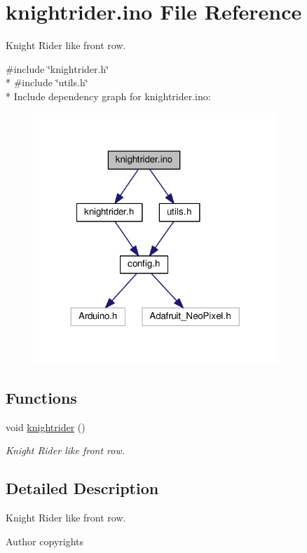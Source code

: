 \hypertarget{knightrider_8ino}{}\section{knightrider.\+ino File Reference}
\label{knightrider_8ino}


Knight Rider like front row.  


{\ttfamily \#include \char`\"{}knightrider.\+h\char`\"{}}\\*
{\ttfamily \#include \char`\"{}utils.\+h\char`\"{}}\\*
Include dependency graph for knightrider.\+ino\+:\nopagebreak
\begin{figure}[H]
\begin{center}
\leavevmode
\includegraphics[width=260pt]{knightrider_8ino__incl}
\end{center}
\end{figure}
\subsection*{Functions}
{\bf }\par
\begin{DoxyCompactItemize}
\item 
void \hyperlink{group__knightrider_ga58bfb7b9f8fcf7a4b02700359057a6f4}{knightrider} ()
\begin{DoxyCompactList}\small\item\em Knight Rider like front row. \end{DoxyCompactList}\end{DoxyCompactItemize}



\subsection{Detailed Description}
Knight Rider like front row. 

\begin{DoxyAuthor}{Author}
copyrights 
\end{DoxyAuthor}
